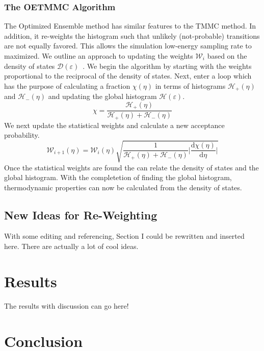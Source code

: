 \documentclass[letterpaper,twocolumn,amsmath,amssymb,pre,aps,10pt]{revtex4-1}
\begin{document}
\subsubsection{The OETMMC Algorithm}

The Optimized Ensemble method has similar features to the TMMC method.  
In  addition, it re-weights the histogram such that unlikely 
(not-probable) transitions are not equally favored.  This allows the 
simulation low-energy sampling rate to maximized.  We outline an 
approach to updating the weights $\mathcal{W}_{i}$ based on the density 
of states 
$\mathcal{D}(\varepsilon)$~\cite{trebst2004optimizing,wessel2007optimized}.  
We begin the algorithm by starting with the weights proportional to the 
reciprocal of the density of states.  Next, enter a loop which has the 
purpose of calculating a fraction $\chi(\eta)$ in terms of histograms 
$\mathcal{H}_{+}(\eta)$ and $\mathcal{H}_{-}(\eta)$ and updating the 
global histogram $\mathcal{H}(\varepsilon)$. \begin{equation}
	\chi = \frac{\mathcal{H}_{+}(\eta)}{\mathcal{H}_{+}(\eta)+\mathcal{H}_{-}(\eta)}
\end{equation}
We next update the statistical weights and calculate a new acceptance probability.
\begin{equation}
	\mathcal{W}_{i+1}(\eta) = \mathcal{W}_{i}(\eta)\sqrt{\frac{1}{\mathcal{H}_{+}(\eta)+
	\mathcal{H}_{-}(\eta)}\bigg|\frac{\text{d}\chi(\eta)}{\text{d}\eta}\bigg|} 
\end{equation}
Once the statistical weights are found the can relate the density of states and the 
global histogram. With the completetion of finding the global histogram, thermodynamic
properties can now be calculated from the density of states.

\subsection{New Ideas for Re-Weighting}

With some editing and referencing, Section I could be rewritten and inserted here.
There are actually a lot of cool ideas.

\section{Results}

The results with discussion can go here!

\section{Conclusion}
\end{document}
